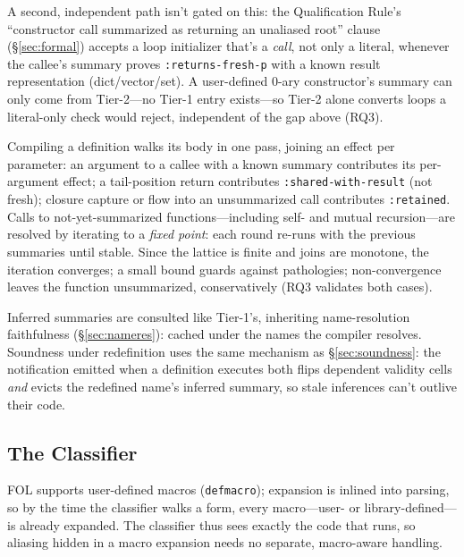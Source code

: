 \documentclass[sigplan,review,anonymous]{acmart}
\begin{document}
A second, independent path isn't gated on this: the Qualification Rule's ``constructor call summarized as returning an unaliased root'' clause (§\ref{sec:formal}) accepts a loop initializer that's a \emph{call}, not only a literal, whenever the callee's summary proves \texttt{:returns-fresh-p} with a known result representation (dict/vector/set). A user-defined 0-ary constructor's summary can only come from Tier-2---no Tier-1 entry exists---so Tier-2 alone converts loops a literal-only check would reject, independent of the gap above (RQ3).

Compiling a definition walks its body in one pass, joining an effect per parameter: an argument to a callee with a known summary contributes its per-argument effect; a tail-position return contributes \texttt{:shared-with-result} (not fresh); closure capture or flow into an unsummarized call contributes \texttt{:retained}. Calls to not-yet-summarized functions---including self- and mutual recursion---are resolved by iterating to a \emph{fixed point}: each round re-runs with the previous summaries until stable. Since the lattice is finite and joins are monotone, the iteration converges; a small bound guards against pathologies; non-convergence leaves the function unsummarized, conservatively (RQ3 validates both cases).

Inferred summaries are consulted like Tier-1's, inheriting name-resolution faithfulness (§\ref{sec:nameres}): cached under the names the compiler resolves. Soundness under redefinition uses the same mechanism as §\ref{sec:soundness}: the notification emitted when a definition executes both flips dependent validity cells \emph{and} evicts the redefined name's inferred summary, so stale inferences can't outlive their code.

\subsection{The Classifier}

FOL supports user-defined macros (\texttt{defmacro}); expansion is inlined into parsing, so by the time the classifier walks a form, every macro---user- or library-defined---is already expanded. The classifier thus sees exactly the code that runs, so aliasing hidden in a macro expansion needs no separate, macro-aware handling.
\end{document}
